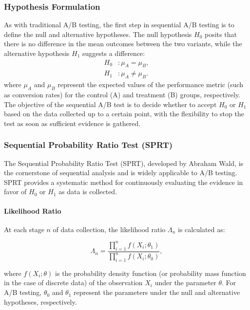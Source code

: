 \documentclass[magisterska, english]{pwr_wmat_praca_dyplomowa}
\theoremstyle{plain}
\numberwithin{theorem}{chapter}
\theoremstyle{definition}
\numberwithin{theorem}{chapter}
\begin{document}
\subsubsection{Hypothesis Formulation}
As with traditional A/B testing, the first step in sequential A/B testing is to define the null and alternative hypotheses. The null hypothesis \( H_0 \) posits that there is no difference in the mean outcomes between the two variants, while the alternative hypothesis \( H_1 \) suggests a difference:
\begin{align*}
	H_0 &: \mu_A = \mu_B, \\
	H_1 &: \mu_A \neq \mu_B.
\end{align*}
where \( \mu_A \) and \( \mu_B \) represent the expected values of the performance metric (such as conversion rates) for the control (A) and treatment (B) groups, respectively. The objective of the sequential A/B test is to decide whether to accept \( H_0 \) or \( H_1 \) based on the data collected up to a certain point, with the flexibility to stop the test as soon as sufficient evidence is gathered.

\subsubsection{Sequential Probability Ratio Test (SPRT)}

The Sequential Probability Ratio Test (SPRT), developed by Abraham Wald, is the cornerstone of sequential analysis and is widely applicable to A/B testing. SPRT provides a systematic method for continuously evaluating the evidence in favor of \( H_0 \) or \( H_1 \) as data is collected.

\paragraph{Likelihood Ratio}

At each stage \( n \) of data collection, the likelihood ratio \( \Lambda_n \) is calculated as:

\[
\Lambda_n = \frac{\prod_{i=1}^{n} f(X_i; \theta_1)}{\prod_{i=1}^{n} f(X_i; \theta_0)},
\]

where \( f(X_i; \theta) \) is the probability density function (or probability mass function in the case of discrete data) of the observation \( X_i \) under the parameter \( \theta \). For A/B testing, \( \theta_0 \) and \( \theta_1 \) represent the parameters under the null and alternative hypotheses, respectively.
\end{document}
